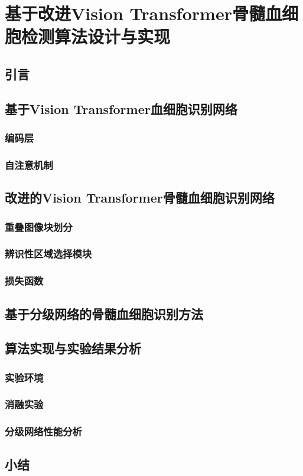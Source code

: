 \chapter{基于改进Vision Transformer骨髓血细胞检测算法设计与实现}
\section{引言}
\section{基于Vision Transformer血细胞识别网络}

\subsection{编码层}
\subsection{自注意机制}

\section{改进的Vision Transformer骨髓血细胞识别网络}
\subsection{重叠图像块划分}
\subsection{辨识性区域选择模块}
\subsection{损失函数}

\section{基于分级网络的骨髓血细胞识别方法}

\section{算法实现与实验结果分析}
\subsection{实验环境}
\subsection{消融实验}
\subsection{分级网络性能分析}
\section{小结}